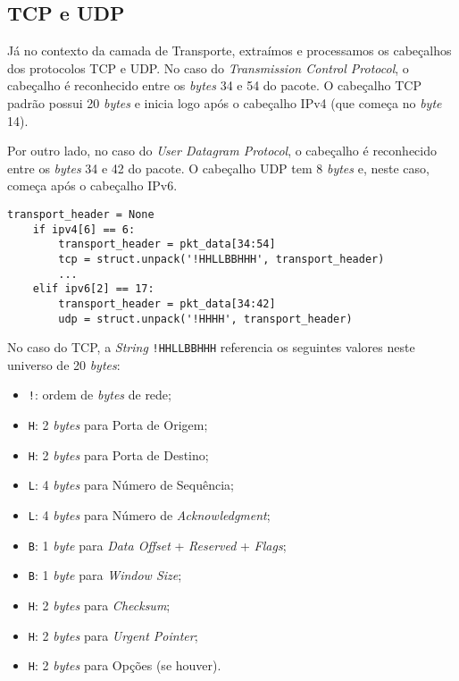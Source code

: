\documentclass[12pt]{article}
\begin{document}
\subsection{TCP e UDP}
Já no contexto da camada de Transporte, extraímos e processamos os cabeçalhos dos protocolos TCP e UDP. No caso do \emph{Transmission Control Protocol}, o cabeçalho é reconhecido entre os \emph{bytes} 34 e 54 do pacote. O cabeçalho TCP padrão possui 20 \emph{bytes} e inicia logo após o cabeçalho IPv4 (que começa no \emph{byte} 14).

\quad Por outro lado, no caso do \emph{User Datagram Protocol}, o cabeçalho é reconhecido entre os \emph{bytes} 34 e 42 do pacote. O cabeçalho UDP tem 8 \emph{bytes} e, neste caso, começa após o cabeçalho IPv6.

\begin{lstlisting}[style=vscode]
transport_header = None
    if ipv4[6] == 6:
        transport_header = pkt_data[34:54]
        tcp = struct.unpack('!HHLLBBHHH', transport_header)
        ...
    elif ipv6[2] == 17:
        transport_header = pkt_data[34:42]
        udp = struct.unpack('!HHHH', transport_header)
\end{lstlisting}

\quad No caso do TCP, a \emph{String} \texttt{!HHLLBBHHH} referencia os seguintes valores neste universo de 20 \emph{bytes}:

\begin{itemize}
    \item \texttt{!}: ordem de \emph{bytes} de rede;
    \item \texttt{H}: 2 \emph{bytes} para Porta de Origem;
    \item \texttt{H}: 2 \emph{bytes} para Porta de Destino;
    \item \texttt{L}: 4 \emph{bytes} para Número de Sequência;
    \item \texttt{L}: 4 \emph{bytes} para Número de \emph{Acknowledgment};
    \item \texttt{B}: 1 \emph{byte} para \emph{Data Offset} + \emph{Reserved} + \emph{Flags};
    \item \texttt{B}: 1 \emph{byte} para \emph{Window Size};
    \item \texttt{H}: 2 \emph{bytes} para \emph{Checksum};
    \item \texttt{H}: 2 \emph{bytes} para \emph{Urgent Pointer};
    \item \texttt{H}: 2 \emph{bytes} para Opções (se houver).
\end{itemize}
\end{document}
